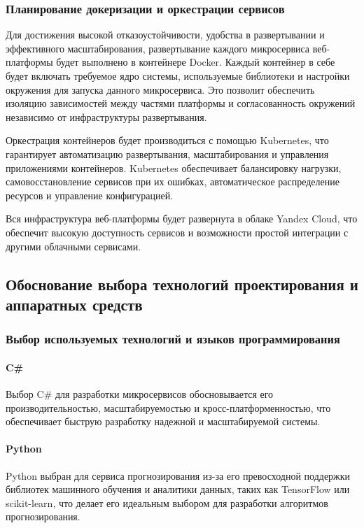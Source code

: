 \subsubsection{Планирование докеризации и оркестрации сервисов}

Для достижения высокой отказоустойчивости, удобства в развертывании и эффективного масштабирования, развертывание каждого микросервиса веб-платформы будет выполнено в контейнере Docker. Каждый контейнер в себе будет включать требуемое ядро системы, используемые библиотеки и настройки окружения для запуска данного микросервиса. Это позволит обеспечить изоляцию зависимостей между частями платформы и согласованность окружений независимо от инфраструктуры развертывания.

Оркестрация контейнеров будет производиться с помощью Kubernetes, что гарантирует автоматизацию развертывания, масштабирования и управления приложениями контейнеров. Kubernetes обеспечивает балансировку нагрузки, самовосстановление сервисов при их ошибках, автоматическое распределение ресурсов и управление конфигурацией.

Вся инфраструктура веб-платформы будет развернута в облаке Yandex Cloud, что обеспечит высокую доступность сервисов и возможности простой интеграции с другими облачными сервисами.

\subsection{Обоснование выбора технологий проектирования и аппаратных средств}
\subsubsection{Выбор используемых технологий и языков программирования}

\paragraph{C\#}

Выбор C\# для разработки микросервисов обосновывается его производительностью, масштабируемостью и кросс-платформенностью, что обеспечивает быструю разработку надежной и масштабируемой системы.

\paragraph{Python}

Python выбран для сервиса прогнозирования из-за его превосходной поддержки библиотек машинного обучения и аналитики данных, таких как TensorFlow или scikit-learn, что делает его идеальным выбором для разработки алгоритмов прогнозирования.

